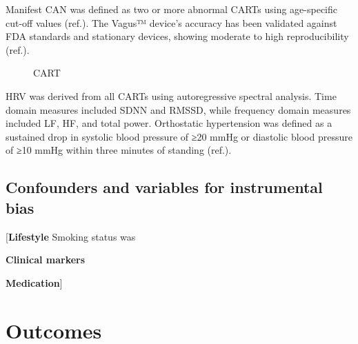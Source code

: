 \documentclass[
  a4paper,
  headsepline=true,
  open=any]{scrbook}
\begin{document}
Manifest CAN was defined as two or more abnormal CARTs using
age-specific cut-off values (ref.). The Vagus™ device's accuracy has
been validated against FDA standards and stationary devices, showing
moderate to high reproducibility (ref.).

\begin{figure}

\begin{minipage}[t]{\linewidth}

{\centering 


\caption{CART}

}

\end{minipage}%

\end{figure}

HRV was derived from all CARTs using autoregressive spectral analysis.
Time domain measures included SDNN and RMSSD, while frequency domain
measures included LF, HF, and total power. Orthostatic hypertension was
defined as a sustained drop in systolic blood pressure of ≥20 mmHg or
diastolic blood pressure of ≥10 mmHg within three minutes of standing
(ref.).

\hypertarget{confounders-and-variables-for-instrumental-bias}{%
\subsection{Confounders and variables for instrumental
bias}\label{confounders-and-variables-for-instrumental-bias}}

{[}\textbf{Lifestyle} Smoking status was

\textbf{Clinical markers}

\textbf{Medication}{]}

\hypertarget{outcomes}{%
\section{Outcomes}\label{outcomes}}
\end{document}
